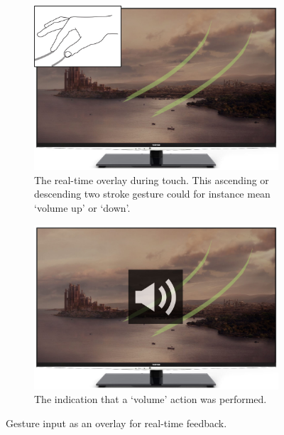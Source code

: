 \begin{figure}[h]
  \centering
  \begin{subfigure}[t]{.44\textwidth}
    \centering
    \includegraphics[width=\linewidth]{figures/touch/evaluation/gesture_overlay}
    \caption{The real-time overlay during touch. This ascending or descending two stroke gesture could for instance mean `volume up' or `down'.}
  \end{subfigure}%
  \hspace{0.02\textwidth}
  \begin{subfigure}[t]{.44\textwidth}
    \centering
    \includegraphics[width=\linewidth]{figures/touch/evaluation/gesture_overlay_2}
    \caption{The indication that a `volume' action was performed.}
  \end{subfigure}
  \caption{Gesture input as an overlay for real-time feedback.}
  \label{fig:textiletouch:eval:overlay}
\end{figure}


